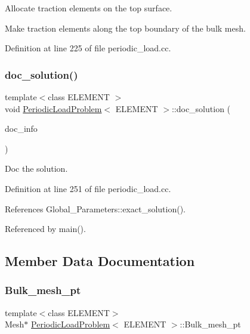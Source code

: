 Allocate traction elements on the top surface. 

Make traction elements along the top boundary of the bulk mesh. 

Definition at line 225 of file periodic\+\_\+load.\+cc.

\mbox{\label{classPeriodicLoadProblem_ad414cf9a0b4a61de439e459f10e762c7}} 
\subsubsection{\texorpdfstring{doc\+\_\+solution()}{doc\_solution()}}
{\footnotesize\ttfamily template$<$class E\+L\+E\+M\+E\+NT $>$ \\
void \hyperlink{classPeriodicLoadProblem}{Periodic\+Load\+Problem}$<$ E\+L\+E\+M\+E\+NT $>$\+::doc\+\_\+solution (\begin{DoxyParamCaption}\item[{Doc\+Info \&}]{doc\+\_\+info }\end{DoxyParamCaption})}



Doc the solution. 



Definition at line 251 of file periodic\+\_\+load.\+cc.



References Global\+\_\+\+Parameters\+::exact\+\_\+solution().



Referenced by main().



\subsection{Member Data Documentation}
\mbox{\label{classPeriodicLoadProblem_a120027bff23e2cd1f17f560c852533b6}} 
\subsubsection{\texorpdfstring{Bulk\+\_\+mesh\+\_\+pt}{Bulk\_mesh\_pt}}
{\footnotesize\ttfamily template$<$class E\+L\+E\+M\+E\+NT$>$ \\
Mesh$\ast$ \hyperlink{classPeriodicLoadProblem}{Periodic\+Load\+Problem}$<$ E\+L\+E\+M\+E\+NT $>$\+::Bulk\+\_\+mesh\+\_\+pt\hspace{0.3cm}{\ttfamily [private]}}



